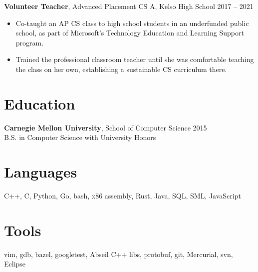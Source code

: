 \documentclass[overlapped]{res}
\newcommand{\experience}[5]{
    \textbf{#3}, #4 \hfill #1 -- #2 \\
    #5
}
\newcommand{\education}[4]{
    \textbf{#2}, #3 \hfill #1 \\
    #4
}
\begin{document}
\begin{resume}
  \experience{2017}{2021}{Volunteer Teacher}{Advanced Placement CS A, Kelso High School}{
    \begin{itemize} \itemsep -1pt
      \item Co-taught an AP CS class to high school students in an
        underfunded public school, as part of Microsoft's Technology Education
        and Learning Support program.
      \item Trained the professional classroom teacher until she was
        comfortable teaching the class on her own, establishing a sustainable
        CS curriculum there.
    \end{itemize}
  }

\section{Education}
  \vspace{0.5ex}

  \education{2015}{Carnegie Mellon University}{School of Computer Science}
  {B.S. in Computer Science with University Honors}

\section{Languages}
  C++, C, Python, Go, bash, x86 assembly, Rust, Java, SQL, SML, JavaScript

\section{Tools}
  vim, gdb, bazel, googletest, Abseil C++ libs, protobuf, git, Mercurial, svn, Eclipse

\end{resume}
\end{document}
